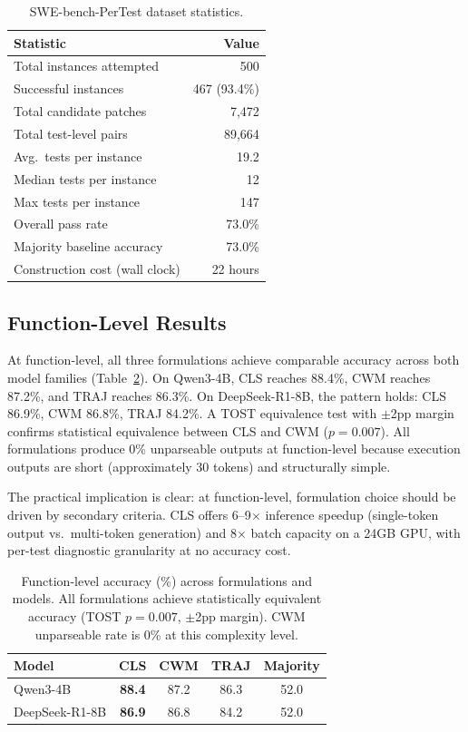 \documentclass[11pt,a4paper]{article}
\begin{document}
\begin{table}[t]
\centering
\small
\caption{SWE-bench-PerTest dataset statistics.}
\label{tab:dataset}
\begin{tabular}{lr}
\toprule
Statistic & Value \\
\midrule
Total instances attempted & 500 \\
Successful instances & 467 (93.4\%) \\
Total candidate patches & 7,472 \\
Total test-level pairs & 89,664 \\
Avg.\ tests per instance & 19.2 \\
Median tests per instance & 12 \\
Max tests per instance & 147 \\
Overall pass rate & 73.0\% \\
Majority baseline accuracy & 73.0\% \\
Construction cost (wall clock) & 22 hours \\
\bottomrule
\end{tabular}
\end{table}

\subsection{Function-Level Results}
\label{sec:func}

At function-level, all three formulations achieve comparable accuracy across both model families (Table~\ref{tab:func}).
On Qwen3-4B, CLS reaches 88.4\%, CWM reaches 87.2\%, and TRAJ reaches 86.3\%.
On DeepSeek-R1-8B, the pattern holds: CLS 86.9\%, CWM 86.8\%, TRAJ 84.2\%.
A TOST equivalence test with $\pm$2pp margin confirms statistical equivalence between CLS and CWM ($p{=}0.007$).
All formulations produce 0\% unparseable outputs at function-level because execution outputs are short (approximately 30 tokens) and structurally simple.

The practical implication is clear: at function-level, formulation choice should be driven by secondary criteria.
CLS offers 6--9$\times$ inference speedup (single-token output vs.\ multi-token generation) and 8$\times$ batch capacity on a 24GB GPU, with per-test diagnostic granularity at no accuracy cost.

\begin{table}[t]
\centering
\small
\caption{Function-level accuracy (\%) across formulations and models. All formulations achieve statistically equivalent accuracy (TOST $p{=}0.007$, $\pm$2pp margin). CWM unparseable rate is 0\% at this complexity level.}
\label{tab:func}
\begin{tabular}{lcccc}
\toprule
\textbf{Model} & \textbf{CLS} & \textbf{CWM} & \textbf{TRAJ} & \textbf{Majority} \\
\midrule
Qwen3-4B   & \textbf{88.4} & 87.2 & 86.3 & 52.0 \\
DeepSeek-R1-8B & \textbf{86.9} & 86.8 & 84.2 & 52.0 \\
\bottomrule
\end{tabular}
\end{table}
\end{document}
